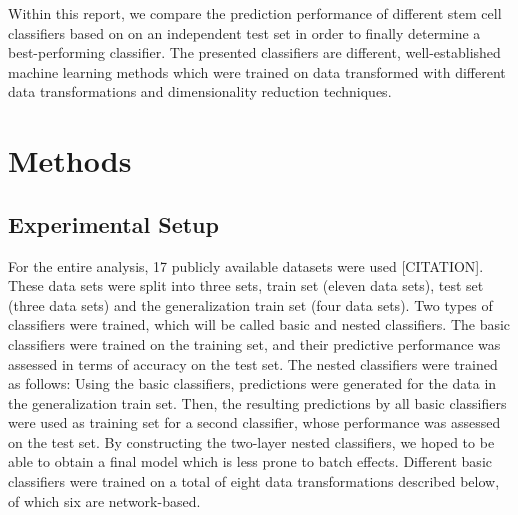 \documentclass[10pt,conference,compsocconf]{IEEEtran}
\begin{document}
\par
Within this report, we compare the prediction performance of different stem cell classifiers based on on an independent test set in order to finally determine a best-performing classifier. The presented classifiers are different, well-established machine learning methods which were trained on data transformed with different data transformations and dimensionality reduction techniques. 

\section*{Methods}
\subsection{Experimental Setup}
For the entire analysis, 17 publicly available datasets were used [CITATION]. These data sets were split into three sets, train set (eleven data sets), test set (three data sets) and the generalization train set (four data sets). Two types of classifiers were trained, which will be called basic and nested classifiers. The basic classifiers were trained on the training set, and their predictive performance was assessed in terms of accuracy on the test set. The nested classifiers were trained as follows: Using the basic classifiers, predictions were generated for the data in the generalization train set. Then, the resulting predictions by all basic classifiers were used as training set for a second classifier, whose performance was assessed on the test set. By constructing the two-layer nested classifiers, we hoped to be able to obtain a final model which is less prone to batch effects. 
Different basic classifiers were trained on a total of eight data transformations described below, of which six are network-based. 
\end{document}
